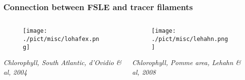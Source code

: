 \documentclass[compress,slidescentered,notes=hide]{beamer}
\newcommand{\legende}[1]{\textit{\footnotesize #1}}
\begin{document}
\begin{frame}
  \frametitle{Connection between FSLE and tracer filaments}
  \begin{columns}
    \begin{column}{0.49\textwidth}
      \begin{figure}
        \texttt{[image: ./pict/misc/lohafex.png]}
      \end{figure}
      \legende{Chlorophyll, South Atlantic, d'Ovidio \& al, 2004} 
    \end{column}
    \begin{column}{0.49\textwidth}
      \begin{figure}
        \texttt{[image: ./pict/misc/lehahn.png]}
      \end{figure}
      \legende{Chlorophyll, Pomme area, Lehahn \& al, 2008}
    \end{column}
  \end{columns}
\end{frame}
%
\end{document}
